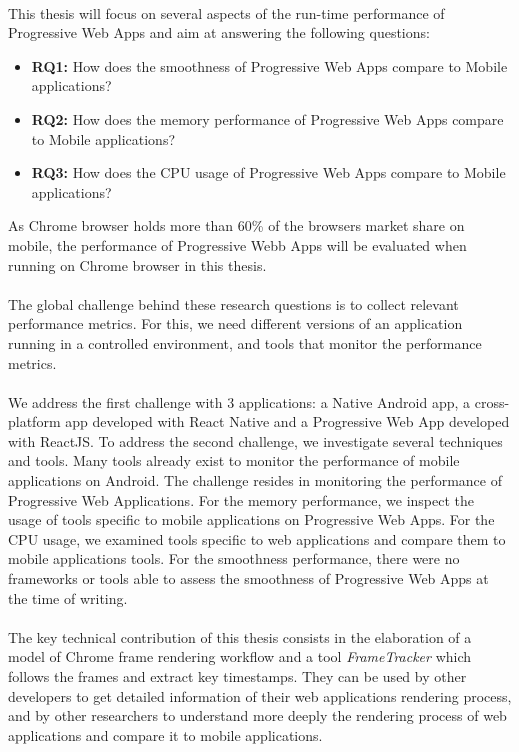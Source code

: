 \documentclass{kththesis}
\begin{document}
\paragraph{}
This thesis will focus on several aspects of the run-time performance of Progressive Web Apps and aim at answering the following questions: 

\begin{itemize}
    \item \textbf{RQ1:} How does the smoothness of Progressive Web Apps compare to Mobile applications? 
    
    \item \textbf{RQ2:} How does the memory performance of Progressive Web Apps compare to Mobile applications? 
    \item \textbf{RQ3:} How does the CPU usage of Progressive Web Apps compare to Mobile applications?
\end{itemize}

As Chrome browser holds more than 60\% of the browsers market share on mobile, the performance of Progressive Webb Apps will be evaluated when running on Chrome browser in this thesis.

\paragraph{}
The global challenge behind these research questions is to collect relevant performance metrics. For this, we need different versions of an application running in a controlled environment, and tools that monitor the performance metrics.
\paragraph{}
We address the first challenge with 3 applications: a Native Android app, a cross-platform app developed with React Native and a Progressive Web App developed with ReactJS. 
To address the second challenge, we investigate several techniques and tools. Many tools already exist to monitor the performance of mobile applications on Android. The challenge resides in monitoring the performance of Progressive Web Applications. For the memory performance, we inspect the usage of tools specific to mobile applications on Progressive Web Apps. For the CPU usage, we examined tools specific to web applications and compare them to mobile applications tools. For the smoothness performance, there were no frameworks or tools able to assess the smoothness of Progressive Web Apps at the time of writing.
\paragraph{}
The key technical contribution of this thesis consists in the elaboration of a model of Chrome frame rendering workflow and a tool \textit{FrameTracker} which follows the frames and extract key timestamps. They can be used by other developers to get detailed information of their web applications rendering process, and by other researchers 
to understand more deeply the rendering process of web applications and compare it to mobile applications. 
\end{document}
